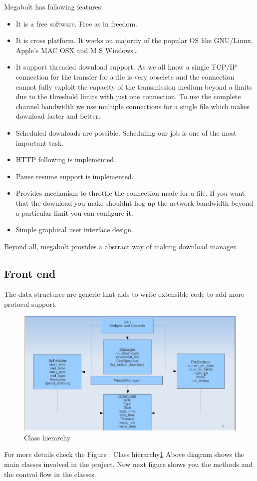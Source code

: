 \documentclass[pdftex,12pt,a4paper,pdfencoding=unicode]{article}
\begin{document}
\begin{onehalfspace}
       Megabolt has following features:
       \begin{itemize}
       \item It is a free software. Free as in freedom.
       \item It is cross platform. It works on majority of the popular OS like GNU/Linux, Apple's MAC OSX and M S Windows\ldots
       \item It support threaded download support. As we all know a single TCP/IP connection for the transfer for a file is very
         obselete and the connection cannot fully exploit the capacity of the transmission medium beyond a limits due to the threshold
         limits with just one connection. To use the complete channel bandwidth we use multiple connections for a single file which
         makes download faster and better.
       \item Scheduled downloads are possible. Scheduling our job is one of the most important task.
       \item HTTP following is implemented.
       \item Pause resume support is implemented.
       \item Provides mechanism to throttle the connection made for a file. If you want that the download you make shouldnt hog up
         the network bandwidth beyond a particular limit you can configure it.
       \item Simple graphical user interface design.
       \end{itemize}

       Beyond all, megabolt provides a abstract way of making download manager.

       \subsection{Front end}
       The data structures are generic that aids to write
       extensible code to add more protocol support. 
       \begin{figure}[h!]
         \includegraphics[scale=0.50]{pic/hier.png}
         \caption{Class hierarchy \label{fig:hier}}
       \end{figure}
       For more details check the Figure : Class hierarchy\ref{fig:hier}
       Above diagram shows the main classes involved in the project. Now next figure shows you the methods and the control flow in the 
       classes.


\end{onehalfspace}
\end{document}
